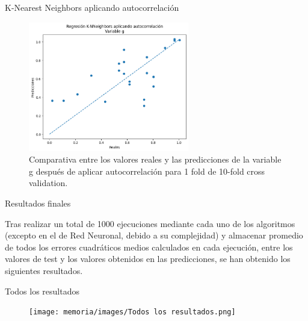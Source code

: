 \documentclass{beamer}
\begin{document}
\begin{frame}{K-Nearest Neighbors aplicando autocorrelación}
    
\begin{figure}
\centering
\includegraphics[width=7cm]{memoria/images/Regresión K-NNeighbors aplicando autocorrelación Variable g.png}
\caption{Comparativa entre los valores reales y las predicciones de la variable g después de aplicar autocorrelación para 1 fold de 10-fold cross validation.}
\end{figure}

\end{frame}

\begin{frame}{Resultados finales}
    
Tras realizar un total de 1000 ejecuciones mediante cada uno de los algoritmos (excepto en el de Red Neuronal, debido a su complejidad) y almacenar promedio de todos los errores cuadráticos medios calculados en cada ejecución, entre los valores de test y los valores obtenidos en las predicciones, se han obtenido los siguientes resultados.

\end{frame}

\begin{frame}{Todos los resultados}
    
\begin{figure}
\centering
\texttt{[image: memoria/images/Todos los resultados.png]}
\end{figure}

\end{frame}
\end{document}
